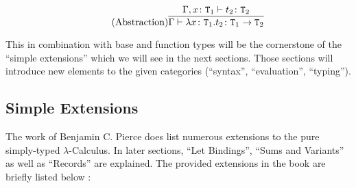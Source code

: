 \begin{equation*}
    \tag{Abstraction}
    \infer{
        \Gamma \vdash \lambda x \colon \texttt{T}_1 . t_2 \colon \texttt{T}_1 \rightarrow \texttt{T}_2
    }{
        \Gamma,x \colon \texttt{T}_1 \vdash t_2 \colon \texttt{T}_2
    }
\end{equation*}

This in combination with base and function types will be the
cornerstone of the ``simple extensions'' which we will see in the
next sections. Those sections will introduce new elements to the given
categories (``syntax'', ``evaluation'', ``typing'').

\subsection{Simple Extensions}

The work of Benjamin C. Pierce does list numerous extensions to the
pure simply-typed $\lambda$-Calculus. In later sections, ``Let Bindings'',
``Sums and Variants'' as well as ``Records'' are explained. The provided
extensions in the book are briefly listed below \cite{pierce2002ProgLang}:

